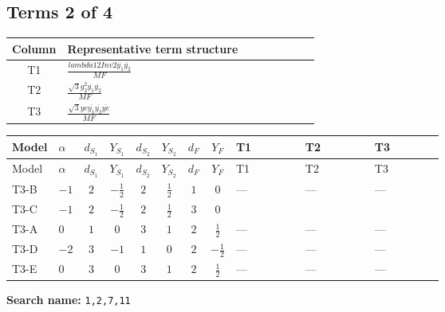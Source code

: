 \documentclass[8pt]{article}
\begin{document}
\begin{landscape}
\subsection*{Terms 2 of 4}
\begin{center}
\begin{tabular}{@{}c >{\raggedright\arraybackslash}p{0.82\linewidth}@{}}
\toprule
Column & Representative term structure \\
\midrule
T1 & \(\displaystyle \frac{lambda12Inv2 \overline{y_{1}} \overline{y_{2}}}{MF}\) \\
\midrule
T2 & \(\displaystyle \frac{\sqrt{3} g_{2}^{2} \overline{y_{1}} \overline{y_{2}}}{MF}\) \\
\midrule
T3 & \(\displaystyle \frac{\sqrt{3} ye \overline{y_{1}} \overline{y_{2}} \overline{ye}}{MF}\) \\
\midrule
\bottomrule
\end{tabular}
\end{center}
\smallskip
\tiny
\begin{longtable}{@{}llcccccc >{\raggedright\arraybackslash}p{0.21\linewidth} >{\raggedright\arraybackslash}p{0.21\linewidth} >{\raggedright\arraybackslash}p{0.21\linewidth}@{}}
\toprule
Model & $\alpha$ & $d_{S_1}$ & $Y_{S_1}$ & $d_{S_2}$ & $Y_{S_2}$ & $d_F$ & $Y_F$ & T1 & T2 & T3 \\
\midrule
\endfirsthead
\toprule
Model & $\alpha$ & $d_{S_1}$ & $Y_{S_1}$ & $d_{S_2}$ & $Y_{S_2}$ & $d_F$ & $Y_F$ & T1 & T2 & T3 \\
\midrule
\endhead
T3-B & $-1$ & $2$ & $-\frac{1}{2}$ & $2$ & $\frac{1}{2}$ & $1$ & $0$ & --- & --- & --- \\
\midrule
T3-C & $-1$ & $2$ & $-\frac{1}{2}$ & $2$ & $\frac{1}{2}$ & $3$ & $0$ & \scriptsize\adjustbox{max width=\linewidth}{$\begin{gathered} \frac{lambda12Inv2 \overline{y_{1}} \overline{y_{2}}}{6 MF}\end{gathered}$} & \scriptsize\adjustbox{max width=\linewidth}{$\begin{gathered} \frac{\sqrt{3} g_{2}^{2} \overline{y_{1}} \overline{y_{2}}}{8 MF}\end{gathered}$} & \scriptsize\adjustbox{max width=\linewidth}{$\begin{gathered} - \frac{\sqrt{3} ye \overline{y_{1}} \overline{y_{2}} \overline{ye}}{24 MF}\end{gathered}$} \\
\midrule
T3-A & $0$ & $1$ & $0$ & $3$ & $1$ & $2$ & $\frac{1}{2}$ & --- & --- & --- \\
\midrule
T3-D & $-2$ & $3$ & $-1$ & $1$ & $0$ & $2$ & $-\frac{1}{2}$ & --- & --- & --- \\
\midrule
T3-E & $0$ & $3$ & $0$ & $3$ & $1$ & $2$ & $\frac{1}{2}$ & --- & --- & --- \\
\midrule
\bottomrule
\end{longtable}
\clearpage
\noindent\textbf{Search name: }\texttt{1,2,7,11}\par\smallskip

\end{landscape}
\end{document}

